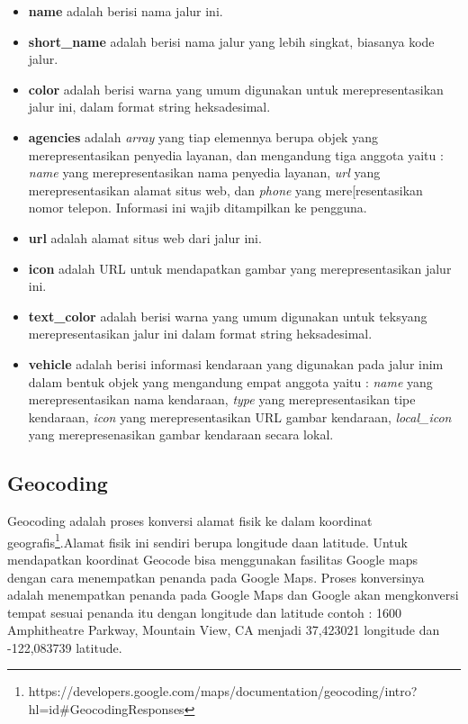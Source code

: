 \begin{itemize}
	\item \textbf{name} adalah berisi nama jalur ini.
	\item \textbf{short\_name} adalah berisi nama jalur yang lebih singkat, biasanya kode jalur.
	\item \textbf{color} adalah berisi warna yang umum digunakan untuk merepresentasikan jalur ini, dalam format string heksadesimal.
	\item \textbf{agencies} adalah \textit{array} yang tiap elemennya berupa objek yang merepresentasikan penyedia layanan, dan mengandung tiga anggota yaitu : \textit{name} yang merepresentasikan nama penyedia layanan, \textit{url} yang merepresentasikan alamat situs web, dan \textit{phone} yang mere[resentasikan nomor telepon. Informasi ini wajib ditampilkan ke pengguna.
	\item \textbf{url} adalah alamat situs web dari jalur ini.
	\item \textbf{icon} adalah URL untuk mendapatkan gambar yang merepresentasikan jalur ini.
	\item \textbf{text\_color} adalah berisi warna yang umum digunakan untuk teksyang merepresentasikan jalur ini dalam format string heksadesimal.
	\item \textbf{vehicle} adalah berisi informasi kendaraan yang digunakan pada jalur inim dalam bentuk objek yang mengandung empat anggota yaitu : \textit{name} yang merepresentasikan nama kendaraan, \textit{type} yang merepresentasikan tipe kendaraan, \textit{icon} yang merepresentasikan URL gambar kendaraan, \textit{local\_icon} yang merepresenasikan gambar kendaraan secara lokal.
\end{itemize}

\subsection{Geocoding}
\label{subsec:Geocoding}
Geocoding adalah proses konversi alamat fisik ke dalam koordinat geografis\footnote{https://developers.google.com/maps/documentation/geocoding/intro?hl=id#GeocodingResponses}.Alamat fisik ini sendiri berupa longitude daan latitude. Untuk mendapatkan koordinat Geocode bisa menggunakan fasilitas Google maps dengan cara menempatkan penanda pada Google Maps. Proses konversinya adalah menempatkan penanda pada Google Maps dan Google akan mengkonversi tempat sesuai penanda itu dengan longitude dan latitude contoh : 1600 Amphitheatre Parkway, Mountain View, CA menjadi 37,423021 longitude dan -122,083739 latitude.